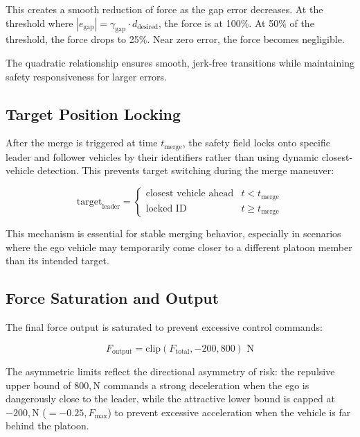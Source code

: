 \documentclass[12pt,a4paper,oneside]{report}
\begin{document}
This creates a smooth reduction of force as the gap error decreases. At the threshold where $|e_{\text{gap}}| = \gamma_{\text{gap}} \cdot d_{\text{desired}}$, the force is at 100\%. At 50\% of the threshold, the force drops to 25\%. Near zero error, the force becomes negligible.

The quadratic relationship ensures smooth, jerk-free transitions while maintaining safety responsiveness for larger errors.

\subsection{Target Position Locking}

After the merge is triggered at time $t_{\text{merge}}$, the safety field locks onto specific leader and follower vehicles by their identifiers rather than using dynamic closest-vehicle detection. This prevents target switching during the merge maneuver:

\begin{equation}
\text{target}_{\text{leader}} = \begin{cases}
\text{closest vehicle ahead} & t < t_{\text{merge}} \\
\text{locked ID} & t \geq t_{\text{merge}}
\end{cases}
\label{eq:target_locking}
\end{equation}

This mechanism is essential for stable merging behavior, especially in scenarios where the ego vehicle may temporarily come closer to a different platoon member than its intended target.

\subsection{Force Saturation and Output}

The final force output is saturated to prevent excessive control commands:

\begin{equation}
F_{\text{output}} = \text{clip}(F_{\text{total}}, -200, 800) \text{ N}
\label{eq:force_saturation}
\end{equation}

The asymmetric limits reflect the directional asymmetry of risk: the repulsive upper bound of $800,\mathrm{N}$ commands a strong deceleration when the ego is dangerously close to the leader, while the attractive lower bound is capped at $-200,\mathrm{N}$ ($=-0.25,F_{\max}$) to prevent excessive acceleration when the vehicle is far behind the platoon.
\end{document}
